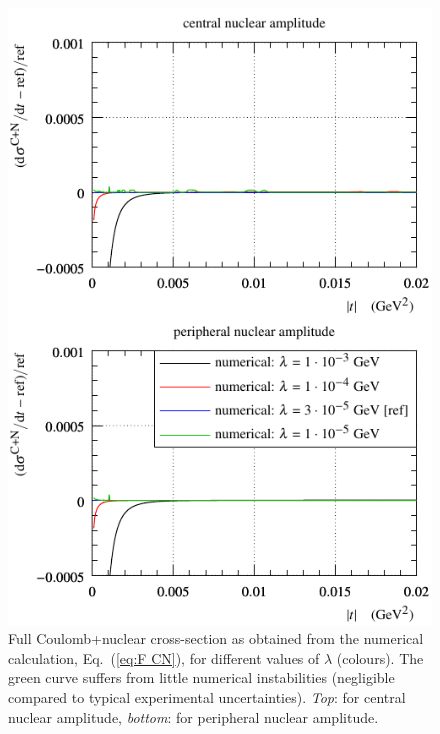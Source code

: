 \documentclass{appolb}
\def\NEW#1{{#1}}
\begin{document}
\begin{figure}[h]
\begin{center}
\includegraphics{fig/cni_dsdt_cmp_lambda.pdf}
\caption{Full Coulomb+nuclear cross-section as obtained from the numerical calculation, Eq.~(\ref{eq:F CN}), for different values of $\lambda$ (colours). The green curve suffers from little numerical instabilities \NEW{(negligible compared to typical experimental uncertainties)}. {\it Top}: for central nuclear amplitude, {\it bottom}: for peripheral nuclear amplitude.}
\label{f:sig CN}
\end{center}
\end{figure}
\end{document}
